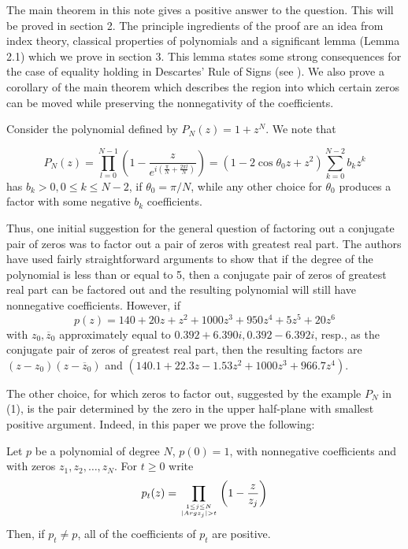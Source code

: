 The main theorem in this note gives a positive answer to the
question.  This will be proved in section 2.  The principle
ingredients of the proof are an idea from index theory, classical
properties of polynomials and a significant lemma (Lemma 2.1) which
we prove in section 3.  This lemma states some strong consequences
for the case of equality holding in Descartes' Rule of Signs (see
\cite{4}).  We also prove a corollary of the main theorem which
describes the region into which certain zeros can be moved while
preserving the nonnegativity of the coefficients.


Consider the polynomial defined by $P_N(z) = 1 + z^N$.  We note that


\begin{equation} P_N(z) = \prod_{l=0}^{N-1}\left(1 -
\frac{z}{e^{i\left(\frac{\pi}{N} +\frac{2\pi l}{N}\right)}}\right) =
(1 - 2\cos\theta_0z +z^2)\sum_{k=0}^{N-2} b_kz^k\label{eq:1}\end{equation} has
$b_{k} >0, 0\leq k\leq N-2$, if $\theta_0 = \pi/N$, while any
other choice for $\theta_0$ produces a factor with some negative
$b_k$ coefficients.

Thus, one initial suggestion for the general question of factoring
out a conjugate pair of zeros was to factor out a pair of zeros with
greatest real part.  The authors have used fairly straightforward
arguments to show that if the degree of the polynomial is less than
or equal to 5, then a conjugate pair of zeros of greatest real part
can be factored out and the resulting polynomial will still have
nonnegative coefficients.  However, if $$p(z) = 140 + 20z + z^2 +
1000z^3 + 950z^4 + 5z^5 + 20z^6$$ with $z_0, \overline{z}_0$
approximately equal to $0.392 + 6.390i, 0.392 - 6.392i$, resp., as
the conjugate pair of zeros of greatest real part, then the resulting
factors are $(z - z_0)(z - \overline{z}_0)$ and $(140.1 + 22.3z -
1.53z^2 + 1000z^3 + 966.7z^4)$.

The other choice, for which zeros to factor out, suggested by the
example $P_N$ in (1), is the pair determined by the zero in the
upper half-plane with smallest positive argument.  Indeed, in this
paper we prove the following:\vspace{12pt}

\begin{theorem} Let $p$ be a polynomial of degree $N$, $p(0) =1 $,
with nonnegative coefficients and with zeros $z_1, z_2,\dots, z_N$.
For $t\geq 0$ write $$p_{t} (z) = \prod_{1\leq j \leq N \atop{ |Arg
z_{j} | > t}} \left( 1 - \frac{z}{z_{j}} \right)$$ Then, if $p_t\neq
p$, all of the coefficients of $p_t$ are positive.
\end{theorem}

